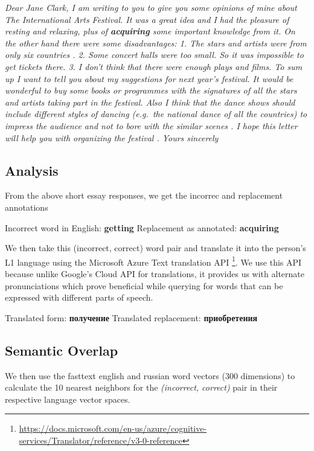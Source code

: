 \documentclass[]{article}
\let\rmarkdownfootnote\footnote%
\def\footnote{\protect\rmarkdownfootnote}
\begin{document}
\emph{Dear Jane Clark, I am writing to you to give you some opinions of
mine about The International Arts Festival. It was a great idea and I
had the pleasure of resting and relaxing, plus of \textbf{acquiring}
some important knowledge from it. On the other hand there were some
disadvantages: 1. The stars and artists were from only six countries .
2. Some concert halls were too small. So it was impossible to get
tickets there. 3. I don't think that there were enough plays and films.
To sum up I want to tell you about my suggestions for next year's
festival. It would be wonderful to buy some books or programmes with the
signatures of all the stars and artists taking part in the festival.
Also I think that the dance shows should include different styles of
dancing (e.g.~the national dance of all the countries) to impress the
audience and not to bore with the similar scenes . I hope this letter
will help you with organizing the festival . Yours sincerely}

\hypertarget{analysis}{%
\subsection{Analysis}\label{analysis}}

From the above short essay responses, we get the incorrec and
replacement annotations

Incorrect word in English: \textbf{getting} Replacement as annotated:
\textbf{acquiring}

We then take this (incorrect, correct) word pair and translate it into
the person's L1 language using the Microsoft Azure Text translation API
\footnote{\url{https://docs.microsoft.com/en-us/azure/cognitive-services/Translator/reference/v3-0-reference}}.
We use this API because unlike Google's Cloud API for translations, it
provides us with alternate pronunciations which prove beneficial while
querying for words that can be expressed with different parts of speech.

Translated form: \textbf{получение} Translated replacement:
\textbf{приобретения}

\hypertarget{semantic-overlap}{%
\subsection{Semantic Overlap}\label{semantic-overlap}}

We then use the fasttext english and russian word vectors (300
dimensions) to calculate the 10 nearest neighbors for the
\emph{(incorrect, correct)} pair in their respective language vector
spaces.
\end{document}
